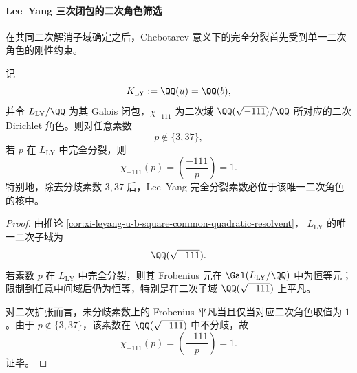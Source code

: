 \paragraph{Lee--Yang 三次闭包的二次角色筛选}
在共同二次解消子域确定之后，Chebotarev 意义下的完全分裂首先受到单一二次角色的刚性约束。

\begin{corollary}\label{cor:xi-leyang-split-primes-quadratic-character-filter}
记
\[
K_{\mathrm{LY}}:=\QQ(u)=\QQ(b),
\]
并令 \(L_{\mathrm{LY}}/\QQ\) 为其 Galois 闭包，\(\chi_{-111}\) 为二次域
\(\QQ(\sqrt{-111})/\QQ\) 所对应的二次 Dirichlet 角色。则对任意素数
\[
p\notin\{3,37\},
\]
若 \(p\) 在 \(L_{\mathrm{LY}}\) 中完全分裂，则
\[
\chi_{-111}(p)=\left(\frac{-111}{p}\right)=1.
\]
特别地，除去分歧素数 \(3,37\) 后，Lee--Yang 完全分裂素数必位于该唯一二次角色的核中。
\end{corollary}
\begin{proof}
由推论 \ref{cor:xi-leyang-u-b-square-common-quadratic-resolvent}，
\(L_{\mathrm{LY}}\) 的唯一二次子域为
\[
\QQ(\sqrt{-111}).
\]
若素数 \(p\) 在 \(L_{\mathrm{LY}}\) 中完全分裂，则其 Frobenius 元在
\(\Gal(L_{\mathrm{LY}}/\QQ)\) 中为恒等元；限制到任意中间域后仍为恒等，特别是在二次子域
\(\QQ(\sqrt{-111})\) 上平凡。

对二次扩张而言，未分歧素数上的 Frobenius 平凡当且仅当对应二次角色取值为 \(1\)。由于 \(p\notin\{3,37\}\)，该素数在
\(\QQ(\sqrt{-111})\) 中不分歧，故
\[
\chi_{-111}(p)=\left(\frac{-111}{p}\right)=1.
\]
证毕。
\end{proof}

\endinput

